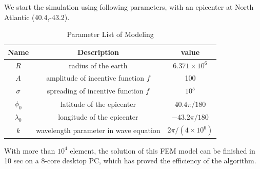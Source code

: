 \documentclass[a4paper]{article}
\begin{document}
We start the simulation using following parameters, with an epicenter at 
North Atlantic (40.4,-43.2).
\begin{table}[h]
    \centering
    \label{tab:params_tab}
    \begin{tabular}{|c||c|c|} %
        \hline
        Name & Description & value\\
        \hline
        $R$ & radius of the earth & $6.371\times 10^6$ \\
        $A$   & amplitude of incentive function $f$ &  100\\
        $\sigma$   & spreading of incentive function $f$ &  $10^5$\\
        $\phi_0$ & latitude of the epicenter & $40.4\pi/180$ \\
        $\lambda_0$ & longitude of the epicenter & $-43.2\pi/180$\\
        $k$ & wavelength parameter in wave equation & $2\pi/(4\times 10^6)$\\
        \hline
    \end{tabular}
    \caption{Parameter List of Modeling}
\end{table}


With more than $10^4$ element, the solution of this FEM model can be finished in 10 sec on 
a 8-core desktop PC, which has proved the efficiency of the algorithm. 
\end{document}
